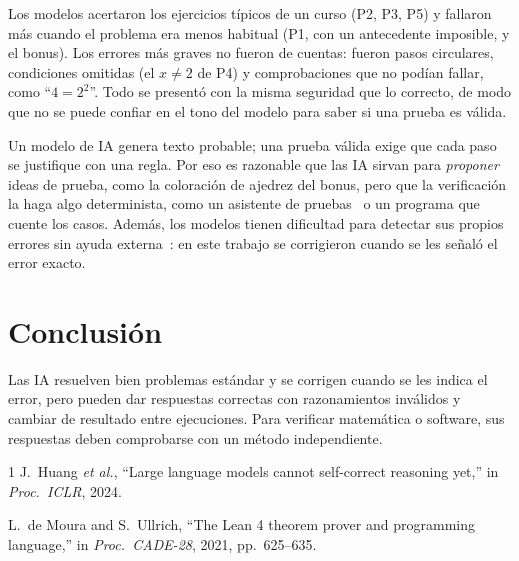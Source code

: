 \documentclass[conference]{IEEEtran}
\begin{document}
Los modelos acertaron los ejercicios típicos de un curso (P2, P3, P5) y fallaron más cuando el problema era menos habitual (P1, con un antecedente imposible, y el bonus). Los errores más graves no fueron de cuentas: fueron pasos circulares, condiciones omitidas (el $x\ne2$ de P4) y comprobaciones que no podían fallar, como ``$4=2^2$''. Todo se presentó con la misma seguridad que lo correcto, de modo que no se puede confiar en el tono del modelo para saber si una prueba es válida.

Un modelo de IA genera texto probable; una prueba válida exige que cada paso se justifique con una regla. Por eso es razonable que las IA sirvan para \emph{proponer} ideas de prueba, como la coloración de ajedrez del bonus, pero que la verificación la haga algo determinista, como un asistente de pruebas~\cite{moura2021} o un programa que cuente los casos. Además, los modelos tienen dificultad para detectar sus propios errores sin ayuda externa~\cite{huang2024}: en este trabajo se corrigieron cuando se les señaló el error exacto.

\section{Conclusión}

Las IA resuelven bien problemas estándar y se corrigen cuando se les indica el error, pero pueden dar respuestas correctas con razonamientos inválidos y cambiar de resultado entre ejecuciones. Para verificar matemática o software, sus respuestas deben comprobarse con un método independiente.

\begin{thebibliography}{1}
J.~Huang \textit{et al.}, ``Large language models cannot self-correct reasoning yet,'' in \textit{Proc.\ ICLR}, 2024.

L.~de Moura and S.~Ullrich, ``The Lean 4 theorem prover and programming language,'' in \textit{Proc.\ CADE-28}, 2021, pp.~625--635.
\end{thebibliography}
\end{document}
